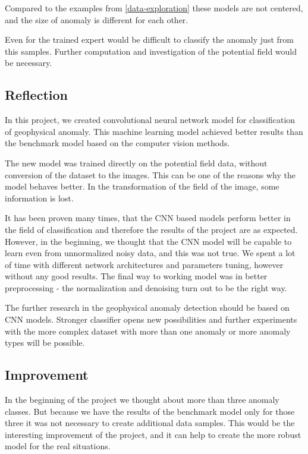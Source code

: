 \documentclass{article}
\begin{document}
Compared to the examples from \ref{data-exploration} these models are not centered, and the size of
anomaly is different for each other. 

Even for the trained expert would be difficult to classify the anomaly just from this samples. Further computation and
investigation of the potential field would be necessary.


\subsection{Reflection}\label{reflection}

In this project, we created convolutional neural network model for
classification of geophysical anomaly. This machine learning model
achieved better results than the benchmark model based on the computer
vision methods.

The new model was trained directly on the potential field data, without
conversion of the dataset to the images. This can be one of the reasons
why the model behaves better. In the transformation of the field of the
image, some information is lost.

It has been proven many times, that the CNN based models perform better
in the field of classification and therefore the results of the project
are as expected. However, in the beginning, we thought that the CNN
model will be capable to learn even from unnormalized noisy data, and
this was not true. We spent a lot of time with different network
architectures and parameters tuning, however without any good results.
The final way to working model was in better preprocessing - the
normalization and denoising turn out to be the right way.

The further research in the geophysical anomaly detection should be
based on CNN models. Stronger classifier opens new possibilities and
further experiments with the more complex dataset with more than one
anomaly or more anomaly types will be possible.

\subsection{Improvement}\label{improvement}

In the beginning of the project we thought about more than three anomaly
classes. But because we have the results of the benchmark model only for
those three it was not necessary to create additional data samples. This
would be the interesting improvement of the project, and it can help to
create the more robust model for the real situations.
\end{document}
